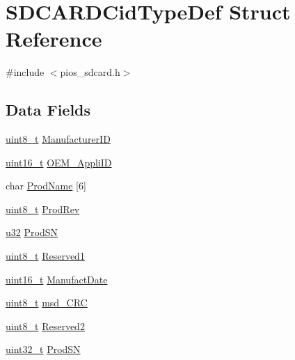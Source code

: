 \hypertarget{struct_s_d_c_a_r_d_cid_type_def}{\section{S\-D\-C\-A\-R\-D\-Cid\-Type\-Def Struct Reference}
\label{struct_s_d_c_a_r_d_cid_type_def}
}


{\ttfamily \#include $<$pios\-\_\-sdcard.\-h$>$}

\subsection*{Data Fields}
\begin{DoxyCompactItemize}
\item 
\hyperlink{stdint_8h_aba7bc1797add20fe3efdf37ced1182c5}{uint8\-\_\-t} \hyperlink{group___p_i_o_s___s_d_c_a_r_d_ga083dff8fb19fcec5bf79ab18c105b6c3}{Manufacturer\-I\-D}
\item 
\hyperlink{stdint_8h_a273cf69d639a59973b6019625df33e30}{uint16\-\_\-t} \hyperlink{group___p_i_o_s___s_d_c_a_r_d_gaba70fef7b702c2d5dc086c3cc997d4bc}{O\-E\-M\-\_\-\-Appli\-I\-D}
\item 
char \hyperlink{group___p_i_o_s___s_d_c_a_r_d_gab56e4945c8b076a1ea66737cbe18f5ce}{Prod\-Name} \mbox{[}6\mbox{]}
\item 
\hyperlink{stdint_8h_aba7bc1797add20fe3efdf37ced1182c5}{uint8\-\_\-t} \hyperlink{group___p_i_o_s___s_d_c_a_r_d_ga8307b63b043ed01d0fa11493c9508dac}{Prod\-Rev}
\item 
\hyperlink{group___exported__types_gafaa62991928fb9fb18ff0db62a040aba}{u32} \hyperlink{group___p_i_o_s___s_d_c_a_r_d_ga3715cb072043477cb6821ce937c498f8}{Prod\-S\-N}
\item 
\hyperlink{stdint_8h_aba7bc1797add20fe3efdf37ced1182c5}{uint8\-\_\-t} \hyperlink{group___p_i_o_s___s_d_c_a_r_d_gaa6d5ceee00ac588d04a7d1e913746732}{Reserved1}
\item 
\hyperlink{stdint_8h_a273cf69d639a59973b6019625df33e30}{uint16\-\_\-t} \hyperlink{group___p_i_o_s___s_d_c_a_r_d_gae7c9d488577977c2c5c2baca30ca6cec}{Manufact\-Date}
\item 
\hyperlink{stdint_8h_aba7bc1797add20fe3efdf37ced1182c5}{uint8\-\_\-t} \hyperlink{group___p_i_o_s___s_d_c_a_r_d_gaeafc9f7dae979dcf639b88246bbe29b6}{msd\-\_\-\-C\-R\-C}
\item 
\hyperlink{stdint_8h_aba7bc1797add20fe3efdf37ced1182c5}{uint8\-\_\-t} \hyperlink{group___p_i_o_s___s_d_c_a_r_d_gab50b795387215c00e5d9b5feb7e9aefb}{Reserved2}
\item 
\hyperlink{stdint_8h_a435d1572bf3f880d55459d9805097f62}{uint32\-\_\-t} \hyperlink{struct_s_d_c_a_r_d_cid_type_def_a3715cb072043477cb6821ce937c498f8}{Prod\-S\-N}
\end{DoxyCompactItemize}


